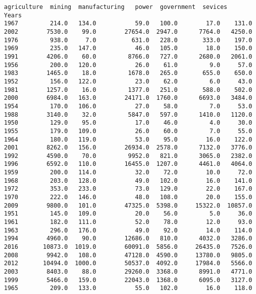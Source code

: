 \documentclass[11pt]{article}
\begin{document}
    \begin{Verbatim}[commandchars=\\\{\}]
       agriculture  mining  manufacturing   power  government  sevices
Years                                                                 
1967         214.0   134.0           59.0   100.0        17.0    131.0
2002        7530.0    99.0        27654.0  2947.0      7764.0   4250.0
1976         938.0     7.0          631.0   228.0       333.0    197.0
1969         235.0   147.0           46.0   105.0        18.0    150.0
1991        4206.0    60.0         8766.0   727.0      2680.0   2061.0
1956         200.0   120.0           26.0    61.0         9.0     57.0
1983        1465.0    18.0         1678.0   265.0       655.0    650.0
1952         156.0   122.0           23.0    62.0         6.0     43.0
1981        1257.0    16.0         1377.0   251.0       588.0    502.0
2000        6984.0   163.0        24171.0  1760.0      6693.0   3484.0
1954         170.0   106.0           27.0    58.0         7.0     53.0
1988        3140.0    32.0         5847.0   597.0      1410.0   1120.0
1950         129.0    95.0           17.0    46.0         4.0     30.0
1955         179.0   109.0           26.0    60.0         7.0     55.0
1964         180.0   119.0           53.0    95.0        16.0    122.0
2001        8262.0   156.0        26934.0  2578.0      7132.0   3776.0
1992        4590.0    70.0         9952.0   821.0      3065.0   2382.0
1996        6592.0   110.0        16455.0  1207.0      4461.0   4064.0
1959         200.0   114.0           32.0    72.0        10.0     72.0
1968         203.0   128.0           49.0   102.0        16.0    141.0
1972         353.0   233.0           73.0   129.0        22.0    167.0
1970         222.0   146.0           48.0   108.0        20.0    155.0
2009        9800.0   101.0        47325.0  5398.0     15322.0  10857.0
1951         145.0   109.0           20.0    56.0         5.0     36.0
1961         182.0   111.0           52.0    78.0        12.0     93.0
1963         296.0   176.0           49.0    92.0        14.0    114.0
1994        4960.0    90.0        12686.0   810.0      4032.0   3286.0
2016       10873.0  1019.0        60091.0  5856.0     26435.0   7526.0
2008        9942.0   108.0        47128.0  4590.0     13780.0   9805.0
2012       10494.0  1000.0        50537.0  4092.0     17984.0   5566.0
2003        8403.0    88.0        29260.0  3368.0      8991.0   4771.0
1999        5466.0   159.0        22043.0  1368.0      6095.0   3127.0
1965         209.0   133.0           55.0   102.0        16.0    118.0

\end{Verbatim}
\end{document}
